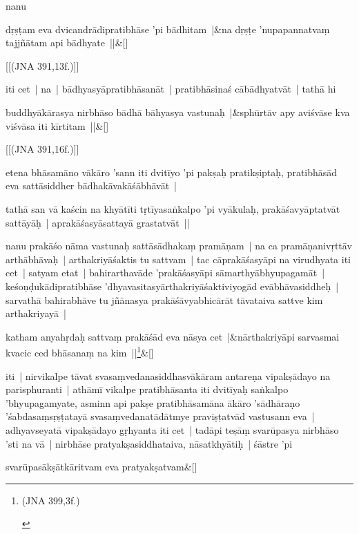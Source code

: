 \documentclass[article,12pt,a4paper]{memoir}
\begin{document}
	

	  \pstart nanu
	\pend
      
	    
	    \stanza[\smallbreak]
	dṛṣṭam eva dvicandrādipratibhāse 'pi bādhitam |&na dṛṣṭe 'nupapannatvaṃ tajjñātam api bādhyate ||\&[\smallbreak]


	[[(JNA 391,13f.)]]

	  \pstart iti cet | na | bādhyasyāpratibhāsanāt | pratibhāsinaś cābādhyatvāt | tathā hi
	\pend
      
	    
	    \stanza[\smallbreak]
	buddhyākārasya nirbhāso bādhā bāhyasya vastunaḥ |&sphūrtāv apy aviśvāse kva viśvāsa iti kīrtitam ||\&[\smallbreak]


	[[(JNA 391,16f.)]]

	  \pstart etena bhāsamāno vākāro 'sann iti dvitīyo 'pi pakṣaḥ pratikṣiptaḥ, pratibhāsād eva sattāsiddher bādhakāvakāśābhāvāt | 
	\pend
      

	  \pstart tathā san vā kaścin na khyātīti tṛtīyasaṅkalpo 'pi vyākulaḥ, prakāśavyāptatvāt sattāyāḥ | aprakāśasyāsattayā grastatvāt || 
	\pend
      

	  \pstart nanu prakāśo nāma vastunaḥ sattāsādhakaṃ pramāṇam | na ca pramāṇanivṛttāv arthābhāvaḥ | arthakriyāśaktis tu sattvam | tac cāprakāśasyāpi na virudhyata iti cet | satyam etat | bahirarthavāde 'prakāśasyāpi sāmarthyābhyupagamāt | keśoṇḍukādipratibhāse 'dhyavasitasyārthakriyāśaktiviyogād evābhāvasiddheḥ | sarvathā bahirabhāve tu jñānasya prakāśāvyabhicārāt tāvataiva sattve kim arthakriyayā | 
	\pend
      
	    
	    \stanza[\smallbreak]
	katham anyahṛdaḥ sattvaṃ prakāśād eva nāsya cet |&nārthakriyāpi sarvasmai kvacic ced bhāsanaṃ na kim ||\footnote{\label{RNA-n-1}  \begin{english}(JNA 399,3f.)\end{english}}\&[\smallbreak]


	

	  \pstart iti | nirvikalpe tāvat svasaṃvedanasiddhasvākāram antareṇa vipakṣādayo na parisphuranti | athāmī vikalpe pratibhāsanta iti dvitīyaḥ saṅkalpo 'bhyupagamyate, asminn api pakṣe pratibhāsamāna ākāro 'sādhāraṇo 'śabdasaṃsṛṣṭatayā svasaṃvedanatādātmye praviṣṭatvād vastusann eva | \label{thakur75-132.32} adhyavseyatā vipakṣādayo gṛhyanta iti cet | tadāpi teṣāṃ svarūpasya nirbhāso 'sti na vā | nirbhāse pratyakṣasiddhataiva, nāsatkhyātiḥ | śāstre 'pi
	\pend
      
	    
	    \stanza[\smallbreak]
	svarūpasākṣātkāritvam eva pratyakṣatvam\&[\smallbreak]
\end{document}
